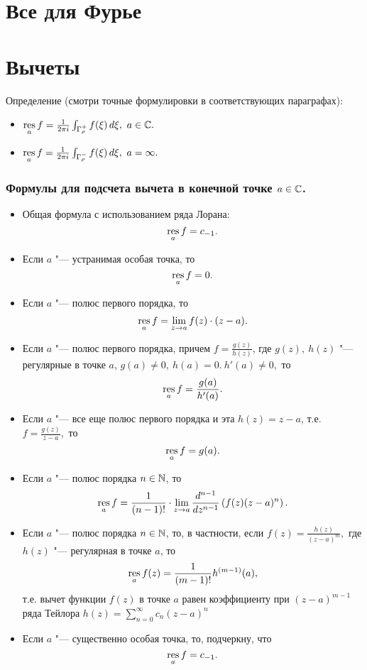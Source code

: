 \section{Все для Фурье}


\section{Вычеты}
Определение (смотри точные формулировки в соответствующих параграфах):
\begin{itemize}
\item
$\mathop{\rm res}\limits_a f=\frac{1}{2\pi i} \int_{\Gamma_{\rho}^{+}} f(\xi)\, d\xi,\ a\in\mathbb{C}.$
\item
$\mathop{\rm res}\limits_a f=\frac{1}{2\pi i} \int_{\Gamma_{\rho}^{-}} f(\xi)\, d\xi,\ a=\infty.$
\end{itemize}

\subsubsection{Формулы для подсчета вычета в конечной точке $a \in \mathbb{C}$.}
\begin{itemize}
\item
Общая формула с использованием ряда Лорана:
$$\mathop{\rm res}\limits_a f = c_{-1}.$$
\item
Если $a$ "--- устранимая особая точка, то
$$\mathop{\rm res}\limits_a f=0.$$
\item 
Если $a$ "--- полюс первого порядка, то
$$\mathop{\rm res}\limits_a f=\lim\limits_{z\to a}{f(z)\cdot(z-a)}.$$
\item
Если $a$ "--- полюс первого порядка, причем $f=\frac{g(z)}{h(z)}$, где $g(z),\ h(z)$ "--- регулярные в точке $a$, $g(a)\neq 0,\ h(a)=0. \ h'(a)\neq 0,$ то 
$$\mathop{\rm res}\limits_a f=\frac{g(a)}{h'(a)}.$$
\item
Если $a$ "--- все еще полюс первого порядка и эта $h(z)=z-a$, т.е. $f=\frac{g(z)}{z-a},$ то
$$\mathop{\rm res}\limits_a f=g(a).$$
\item
Если $a$ "--- полюс порядка $n\in\mathbb{N}$, то
$$
\mathop{\rm res}\limits_a f = \frac{1}{(n-1)!}\cdot \lim\limits_{z\to a} \frac{d^{n-1}}{dz^{n-1}}\left(f(z)(z-a)^n\right).
$$
\item
Если $a$ "--- полюс порядка $n\in\mathbb{N}$, то, в частности, если $f(z)=\frac{h(z)}{(z-a)^m},$ где $h(z)$ "--- регулярная в точке $a$, то 
$$\mathop{\rm res}\limits_a f(z) = \frac{1}{(m-1)!} h^{(m-1)}(a),$$
т.е. вычет функции $f(z)$ в точке $a$ равен коэффициенту при $(z-a)^{m-1}$ ряда Тейлора $h(z)=\sum\limits_{n=0}^{\infty} c_n (z-a)^n$

\item
Если  $a$ "--- существенно особая точка, то, подчеркну, что 
$$\mathop{\rm res}\limits_a f = c_{-1}.$$
\end{itemize}

